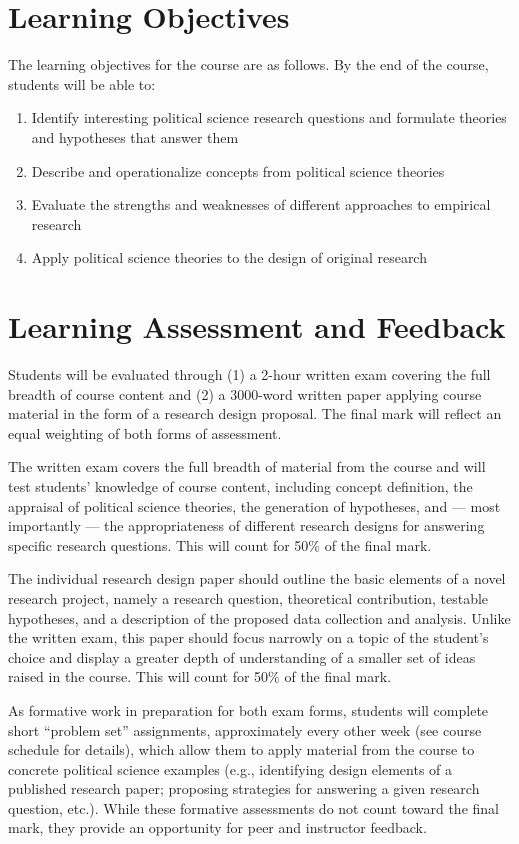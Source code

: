 \documentclass[12pt,a4paper]{article}
\begin{document}
\clearpage
\section{Learning Objectives}
The learning objectives for the course are as follows. By the end of the course, students will be able to:

\begin{enumerate}
\item Identify interesting political science research questions and formulate theories and hypotheses that answer them
\item Describe and operationalize concepts from political science theories
\item Evaluate the strengths and weaknesses of different approaches to empirical research
\item Apply political science theories to the design of original research
\end{enumerate}

\section{Learning Assessment and Feedback}

Students will be evaluated through (1) a 2-hour written exam covering the full breadth of course content and (2) a 3000-word written paper applying course material in the form of a research design proposal. The final mark will reflect an equal weighting of both forms of assessment.

The written exam covers the full breadth of material from the course and will test students' knowledge of course content, including concept definition, the appraisal of political science theories, the generation of hypotheses, and --- most importantly --- the appropriateness of different research designs for answering specific research questions. This will count for 50\% of the final mark.

The individual research design paper should outline the basic elements of a novel research project, namely a research question, theoretical contribution, testable hypotheses, and a description of the proposed data collection and analysis. Unlike the written exam, this paper should focus narrowly on a topic of the student's choice and display a greater depth of understanding of a smaller set of ideas raised in the course. This will count for 50\% of the final mark.

As formative work in preparation for both exam forms, students will complete short ``problem set'' assignments, approximately every other week (see course schedule for details), which allow them to apply material from the course to concrete political science examples (e.g., identifying design elements of a published research paper; proposing strategies for answering a given research question, etc.). While these formative assessments do not count toward the final mark, they provide an opportunity for peer and instructor feedback.
\end{document}
